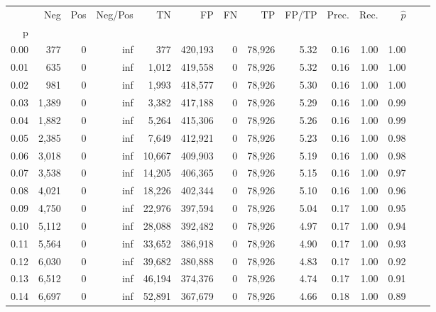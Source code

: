 \begin{tabular}{rrrrrrrrrrrrrr}
\toprule
{} &    Neg &    Pos &  Neg/Pos &       TN &       FP &      FN &      TP & FP/TP & Prec. &  Rec. & $\hat{p}$ \\
p    &        &        &          &          &          &         &         &       &       &       &           \\
\midrule
0.00 &    377 &      0 &      inf &      377 &  420,193 &       0 &  78,926 &  5.32 &  0.16 &  1.00 &      1.00 \\
0.01 &    635 &      0 &      inf &    1,012 &  419,558 &       0 &  78,926 &  5.32 &  0.16 &  1.00 &      1.00 \\
0.02 &    981 &      0 &      inf &    1,993 &  418,577 &       0 &  78,926 &  5.30 &  0.16 &  1.00 &      1.00 \\
0.03 &  1,389 &      0 &      inf &    3,382 &  417,188 &       0 &  78,926 &  5.29 &  0.16 &  1.00 &      0.99 \\
0.04 &  1,882 &      0 &      inf &    5,264 &  415,306 &       0 &  78,926 &  5.26 &  0.16 &  1.00 &      0.99 \\
0.05 &  2,385 &      0 &      inf &    7,649 &  412,921 &       0 &  78,926 &  5.23 &  0.16 &  1.00 &      0.98 \\
0.06 &  3,018 &      0 &      inf &   10,667 &  409,903 &       0 &  78,926 &  5.19 &  0.16 &  1.00 &      0.98 \\
0.07 &  3,538 &      0 &      inf &   14,205 &  406,365 &       0 &  78,926 &  5.15 &  0.16 &  1.00 &      0.97 \\
0.08 &  4,021 &      0 &      inf &   18,226 &  402,344 &       0 &  78,926 &  5.10 &  0.16 &  1.00 &      0.96 \\
0.09 &  4,750 &      0 &      inf &   22,976 &  397,594 &       0 &  78,926 &  5.04 &  0.17 &  1.00 &      0.95 \\
0.10 &  5,112 &      0 &      inf &   28,088 &  392,482 &       0 &  78,926 &  4.97 &  0.17 &  1.00 &      0.94 \\
0.11 &  5,564 &      0 &      inf &   33,652 &  386,918 &       0 &  78,926 &  4.90 &  0.17 &  1.00 &      0.93 \\
0.12 &  6,030 &      0 &      inf &   39,682 &  380,888 &       0 &  78,926 &  4.83 &  0.17 &  1.00 &      0.92 \\
0.13 &  6,512 &      0 &      inf &   46,194 &  374,376 &       0 &  78,926 &  4.74 &  0.17 &  1.00 &      0.91 \\
0.14 &  6,697 &      0 &      inf &   52,891 &  367,679 &       0 &  78,926 &  4.66 &  0.18 &  1.00 &      0.89 \\

\end{tabular}
